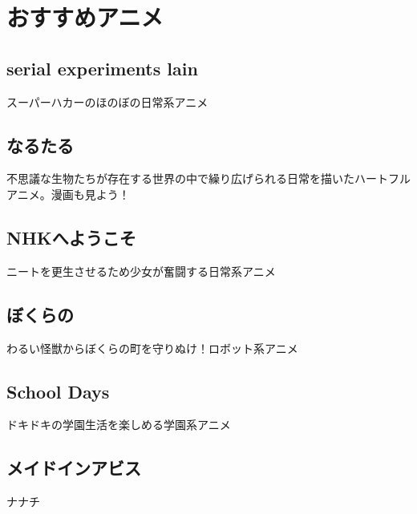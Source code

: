 \documentclass{jarticle}
\begin{document}
\section{おすすめアニメ}
   \subsection{serial experiments lain}
      スーパーハカーのほのぼの日常系アニメ
   \subsection{なるたる}
      不思議な生物たちが存在する世界の中で繰り広げられる日常を描いたハートフルアニメ。漫画も見よう！
   \subsection{NHKへようこそ}
      ニートを更生させるため少女が奮闘する日常系アニメ
   \subsection{ぼくらの}
      わるい怪獣からぼくらの町を守りぬけ！ロボット系アニメ
   \subsection{School Days}
      ドキドキの学園生活を楽しめる学園系アニメ
   \subsection{メイドインアビス}
      ナナチ
\end{document}
